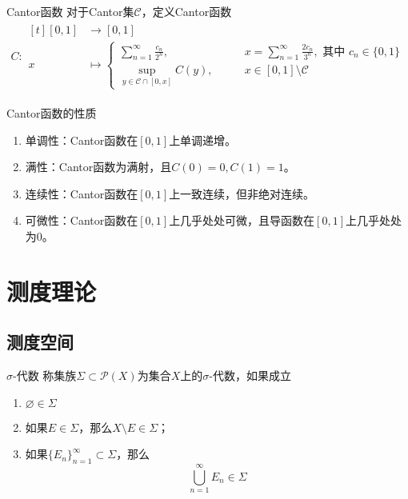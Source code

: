 \documentclass[lang = cn, scheme = chinese, thmcnt = section]{elegantbook}
\newcommand{\sub}{\subset}             %
\newcommand{\dis}{\displaystyle}
\begin{document}
\begin{definition}{Cantor函数}
	对于Cantor集$\mathcal{C}$，定义Cantor函数
	\begin{align*}
		C:\begin{aligned}[t]
			[0,1] &\longrightarrow [0,1]\\
			x &\longmapsto \begin{cases}
				\dis\sum_{n=1}^{\infty}\frac{c_n}{2^n},\qquad &\dis x=\sum_{n=1}^{\infty}\frac{2c_n}{3^n},\text{ 其中 }c_n\in\{0,1\}\\
				\dis\sup_{y\in \mathcal{C}\cap[0,x]}C(y),\qquad &  x\in [0,1]\setminus\mathcal{C}
			\end{cases}
		\end{aligned}
	\end{align*}
\end{definition}

\begin{theorem}{Cantor函数的性质}
	\begin{enumerate}
		\item 单调性：Cantor函数在$[0,1]$上单调递增。
		\item 满性：Cantor函数为满射，且$C(0)=0,C(1)=1$。
		\item 连续性：Cantor函数在$[0,1]$上一致连续，但非绝对连续。
		\item 可微性：Cantor函数在$[0,1]$上几乎处处可微，且导函数在$[0,1]$上几乎处处为$0$。
	\end{enumerate}
\end{theorem}

\chapter{测度理论}

\section{测度空间}

\begin{definition}{$\sigma$-代数}
	称集族$\Sigma\sub\mathscr{P}(X)$为集合$X$上的$\sigma$-代数，如果成立
	\begin{enumerate}
		\item $\varnothing\in\Sigma$
		\item 如果$E\in\Sigma$，那么$X\setminus E\in\Sigma$；
		\item 如果$\{ E_n \}_{n=1}^{\infty}\sub \Sigma$，那么
		$$
		\bigcup_{n=1}^{\infty}{E_n}\in\Sigma
		$$
	\end{enumerate}
\end{definition}
\end{document}
